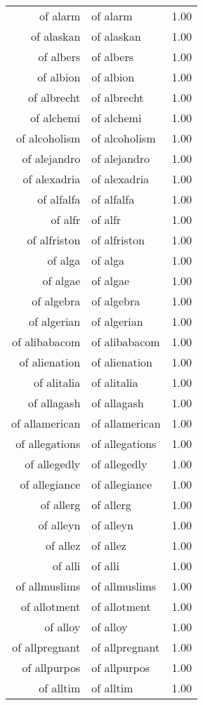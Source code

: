 \begin{table}[ht]
\begin{tabular}{rlr}
  of alarm & of alarm & 1.00 \\ 
  of alaskan & of alaskan & 1.00 \\ 
  of albers & of albers & 1.00 \\ 
  of albion & of albion & 1.00 \\ 
  of albrecht & of albrecht & 1.00 \\ 
  of alchemi & of alchemi & 1.00 \\ 
  of alcoholism & of alcoholism & 1.00 \\ 
  of alejandro & of alejandro & 1.00 \\ 
  of alexadria & of alexadria & 1.00 \\ 
  of alfalfa & of alfalfa & 1.00 \\ 
  of alfr & of alfr & 1.00 \\ 
  of alfriston & of alfriston & 1.00 \\ 
  of alga & of alga & 1.00 \\ 
  of algae & of algae & 1.00 \\ 
  of algebra & of algebra & 1.00 \\ 
  of algerian & of algerian & 1.00 \\ 
  of alibabacom & of alibabacom & 1.00 \\ 
  of alienation & of alienation & 1.00 \\ 
  of alitalia & of alitalia & 1.00 \\ 
  of allagash & of allagash & 1.00 \\ 
  of allamerican & of allamerican & 1.00 \\ 
  of allegations & of allegations & 1.00 \\ 
  of allegedly & of allegedly & 1.00 \\ 
  of allegiance & of allegiance & 1.00 \\ 
  of allerg & of allerg & 1.00 \\ 
  of alleyn & of alleyn & 1.00 \\ 
  of allez & of allez & 1.00 \\ 
  of alli & of alli & 1.00 \\ 
  of allmuslims & of allmuslims & 1.00 \\ 
  of allotment & of allotment & 1.00 \\ 
  of alloy & of alloy & 1.00 \\ 
  of allpregnant & of allpregnant & 1.00 \\ 
  of allpurpos & of allpurpos & 1.00 \\ 
  of alltim & of alltim & 1.00 \\ 

\end{tabular}
\end{table}
